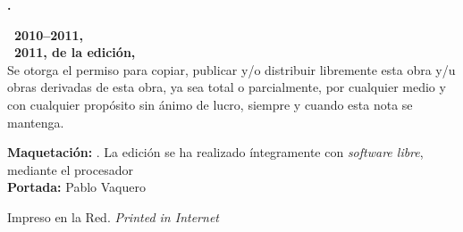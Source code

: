 \noindent
\textbf{\thetitle. \thesubtitle}\\
\theauthor

\bigskip\bigskip\footnotesize\noindent
\textbf{\copyleft\ 2010--2011, \theauthor}\\
\textbf{\copyleft\ 2011, de la edición, \theeditor}\\
Se otorga el permiso para copiar, publicar y/o distribuir libremente esta obra y/u obras derivadas de esta obra, ya sea total o parcialmente, por cualquier medio y con cualquier propósito sin ánimo de lucro, siempre y cuando esta nota se mantenga.

\bigskip\noindent
\textbf{Maquetación:} \theeditor. La edición se ha realizado íntegramente con \emph{software libre}, mediante el procesador \emph{\LaTeXe}\\
\textbf{Portada:} Pablo Vaquero

\bigskip\noindent
Impreso en la Red. \emph{Printed in Internet}
\normalsize
{}

\endinput
